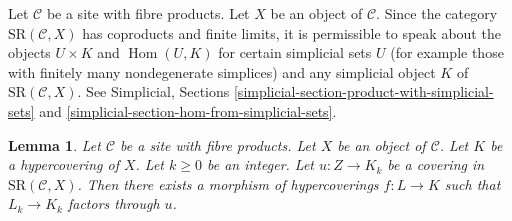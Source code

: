 \documentclass{stacks-project}
\theoremstyle{plain}
\newtheorem{lemma}[subsection]{Lemma}
\theoremstyle{definition}
\theoremstyle{remark}
\numberwithin{equation}{subsection}
\def\Hom{\mathop{\mathrm{Hom}}\nolimits}
\begin{document}
\noindent
Let $\mathcal{C}$ be a site with fibre products.
Let $X$ be an object of $\mathcal{C}$.
Since the category $\text{SR}(\mathcal{C}, X)$ has coproducts and
finite limits, it is permissible to speak about the objects
$U \times K$ and $\Hom(U, K)$ for certain simplicial sets $U$
(for example those with finitely many nondegenerate simplices)
and any simplicial object $K$ of $\text{SR}(\mathcal{C}, X)$.
See Simplicial, Sections
\ref{simplicial-section-product-with-simplicial-sets} and
\ref{simplicial-section-hom-from-simplicial-sets}.

\begin{lemma}
\label{lemma-covering}
Let $\mathcal{C}$ be a site with fibre products.
Let $X$ be an object of $\mathcal{C}$.
Let $K$ be a hypercovering of $X$.
Let $k \geq 0$ be an integer.
Let $u : Z \to K_k$ be a covering
in $\text{SR}(\mathcal{C}, X)$.
Then there exists a morphism of hypercoverings
$f: L \to K$ such that $L_k \to K_k$
factors through $u$.
\end{lemma}
\end{document}
